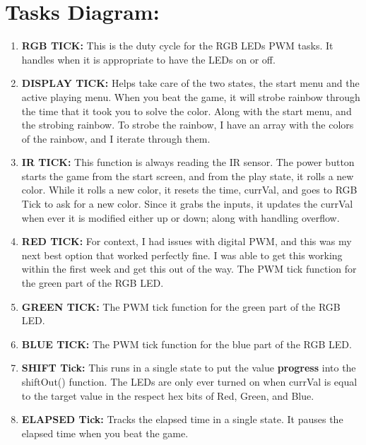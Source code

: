 \documentclass[12pt]{article}
\begin{document}
\pagebreak
\section{Tasks Diagram:}
\begin{enumerate}
  \item\textbf{RGB TICK:}
    This is the duty cycle for the RGB LEDs PWM tasks.
    It handles when it is appropriate to have the LEDs on or off.
  \item\textbf{DISPLAY TICK:}
    Helps take care of the two states, the start menu and the active playing menu.
    When you beat the game, it will strobe rainbow through the time that it took you to solve the color.
    Along with the start menu, and the strobing rainbow.
    To strobe the rainbow, I have an array with the colors of the rainbow,
    and I iterate through them.
  \item\textbf{IR TICK:}
    This function is always reading the IR sensor.
    The power button starts the game from the start screen, and from the play state, it rolls a new color.
    While it rolls a new color, it resets the time, currVal, and goes to RGB Tick to ask for a new color.
    Since it grabs the inputs, it updates the currVal when ever it is modified either up or down;
    along with handling overflow.
  \item\textbf{RED TICK:}
    For context, I had issues with digital PWM, and this was my next best option that worked perfectly fine.
    I was able to get this working within the first week and get this out of the way.
    The PWM tick function for the green part of the RGB LED.
  \item\textbf{GREEN TICK:}
    The PWM tick function for the green part of the RGB LED.
  \item\textbf{BLUE TICK:}
    The PWM tick function for the blue part of the RGB LED.
  \item\textbf{SHIFT Tick:}
    This runs in a single state to put the value \textbf{progress} into
    the shiftOut() function. The LEDs are only ever turned on when
    currVal is equal to the target value in the respect hex bits of Red, Green, and Blue.
  \item\textbf{ELAPSED Tick:}
    Tracks the elapsed time in a single state.
    It pauses the elapsed time when you beat the game.
\end{enumerate}
\end{document}
